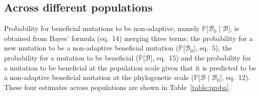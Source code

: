 \documentclass{article}
\newcommand{\proba}{\mathbb{P}}
\newcommand{\SphyBen}{\mathcal{B}_0}
\newcommand{\given}{\mid}
\newcommand{\SpopBen}{\mathcal{B}}
\begin{document}
    \subsection{Across different populations}
    Probability for beneficial mutations to be non-adaptive, namely $\proba{[}\SphyBen\given \SpopBen {]}$, is obtained from Bayes' formula (eq.~14) merging three terms: the probability for a new mutation to be a non-adaptive beneficial mutation ($\proba{[} \SphyBen {]}$, eq.~5), the probability for a mutation to be beneficial ($\proba{[} \SpopBen {]}$, eq.~15) and the probability for a mutation to be beneficial at the population scale given that it is predicted to be a non-adaptive beneficial mutation at the phylogenetic scale ($\proba{[} \SpopBen \given \SphyBen{]}$, eq.~12).
    These four estimates across populations are shown in Table~\ref{table:proba}.
\end{document}
